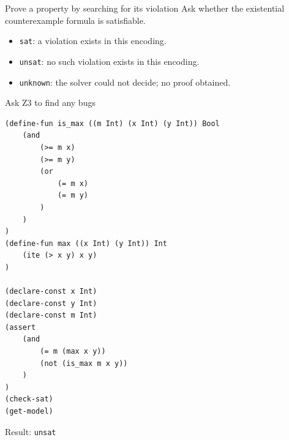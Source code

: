 \begin{frame}{Prove a property by searching for its violation}
Ask whether the existential counterexample formula is satisfiable.
\begin{center}
\end{center}
\begin{itemize}
\item \texttt{sat}: a violation exists in this encoding.
\item \texttt{unsat}: no such violation exists in this encoding.
\item \texttt{unknown}: the solver could not decide; no proof obtained.
\end{itemize}
\end{frame}

\begin{frame}[fragile]{Ask Z3 to find any bugs}
\begin{lstlisting}[language={},basicstyle=\ttfamily\fontsize{6}{7}\selectfont]
(define-fun is_max ((m Int) (x Int) (y Int)) Bool
    (and
        (>= m x)
        (>= m y)
        (or
            (= m x)
            (= m y)
        )
    )
)
(define-fun max ((x Int) (y Int)) Int
    (ite (> x y) x y)
)

(declare-const x Int)
(declare-const y Int)
(declare-const m Int)
(assert
    (and
        (= m (max x y))
        (not (is_max m x y))
    )
)
(check-sat)
(get-model)
\end{lstlisting}
Result: \texttt{unsat}
\end{frame}



